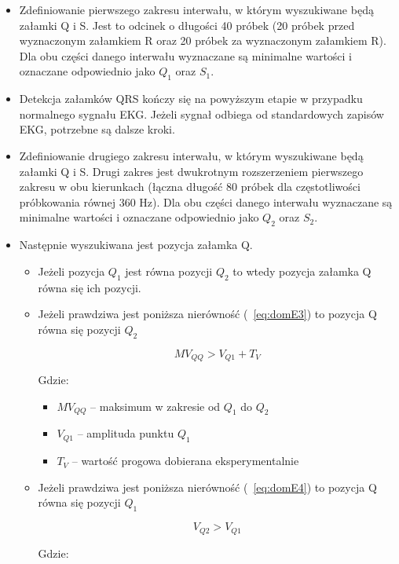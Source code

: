 \documentclass[10pt,a4paper]{article}
\begin{document}
\begin{itemize}
	\item Zdefiniowanie pierwszego zakresu interwału, w którym wyszukiwane będą załamki Q i S. Jest to odcinek o długości 40 próbek (20 próbek przed wyznaczonym załamkiem R oraz 20 próbek za wyznaczonym załamkiem R). Dla obu części danego interwału wyznaczane są minimalne wartości i oznaczane odpowiednio jako $Q_1$ oraz $S_1$. 
	\item Detekcja załamków QRS kończy się na powyższym etapie w przypadku normalnego sygnału EKG. Jeżeli sygnał odbiega od standardowych zapisów EKG, potrzebne są dalsze kroki.
	\item Zdefiniowanie drugiego zakresu interwału, w którym wyszukiwane będą załamki Q i S. Drugi zakres jest dwukrotnym rozszerzeniem pierwszego zakresu w obu kierunkach (łączna długość 80 próbek dla częstotliwości próbkowania równej 360 Hz). Dla obu części danego interwału wyznaczane są minimalne wartości i oznaczane odpowiednio jako $Q_2$ oraz $S_2$.
	\item Następnie wyszukiwana jest pozycja załamka Q.
	\begin{itemize}
	\item Jeżeli pozycja $Q_1$ jest równa pozycji $Q_2$ to wtedy pozycja załamka Q równa się ich pozycji.
	\item Jeżeli prawdziwa jest poniższa nierówność (~\ref{eq:domE3}) to pozycja Q równa się pozycji $Q_2$

	\begin{equation} \label{eq:domE3}			
	 	MV_{QQ}>V_{Q1}+T_V
	\end{equation}			
			
Gdzie:
			
	\begin{itemize}
	\item $MV_{QQ}$ – maksimum w zakresie od $Q_1$ do $Q_2$
	\item $V_{Q1}$ – amplituda punktu $Q_1$
	\item $T_V$ – wartość progowa dobierana eksperymentalnie
	\end{itemize}
			
	\item Jeżeli prawdziwa jest poniższa nierówność (~\ref{eq:domE4}) to pozycja Q równa się pozycji $Q_1$
	
	\begin{equation} \label{eq:domE4}		
		V_{Q2}>V_{Q1}
	\end{equation}		
			
Gdzie:
			

\end{itemize}
\end{itemize}
\end{document}
